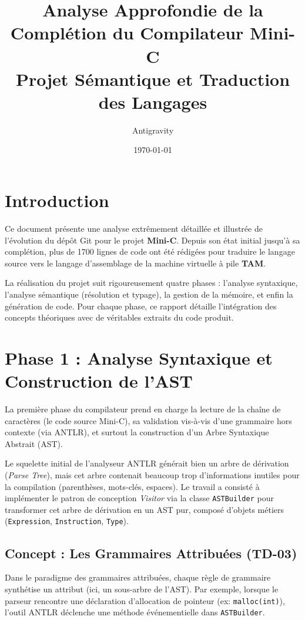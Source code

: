 \documentclass[12pt,a4paper]{article}
\title{Analyse Approfondie de la Complétion du Compilateur Mini-C \\ \large Projet Sémantique et Traduction des Langages}
\author{Antigravity}
\date{\today}
\begin{document}
\maketitle

\tableofcontents
\newpage

\section*{Introduction}
Ce document présente une analyse extrêmement détaillée et illustrée de l'évolution du dépôt Git pour le projet \textbf{Mini-C}. Depuis son état initial jusqu'à sa complétion, plus de 1700 lignes de code ont été rédigées pour traduire le langage source vers le langage d'assemblage de la machine virtuelle à pile \textbf{TAM}.

La réalisation du projet suit rigoureusement quatre phases : l'analyse syntaxique, l'analyse sémantique (résolution et typage), la gestion de la mémoire, et enfin la génération de code. Pour chaque phase, ce rapport détaille l'intégration des concepts théoriques avec de véritables extraits du code produit.

\newpage
\section{Phase 1 : Analyse Syntaxique et Construction de l'AST}

La première phase du compilateur prend en charge la lecture de la chaîne de caractères (le code source Mini-C), sa validation vis-à-vis d'une grammaire hors contexte (via ANTLR), et surtout la construction d'un Arbre Syntaxique Abstrait (AST).

Le squelette initial de l'analyseur ANTLR générait bien un arbre de dérivation (\textit{Parse Tree}), mais cet arbre contenait beaucoup trop d'informations inutiles pour la compilation (parenthèses, mots-clés, espaces). Le travail a consisté à implémenter le patron de conception \textit{Visitor} via la classe \texttt{ASTBuilder} pour transformer cet arbre de dérivation en un AST pur, composé d'objets métiers (\texttt{Expression}, \texttt{Instruction}, \texttt{Type}).

\subsection{Concept : Les Grammaires Attribuées (TD-03)}
Dans le paradigme des grammaires attribuées, chaque règle de grammaire synthétise un attribut (ici, un sous-arbre de l'AST). Par exemple, lorsque le parseur rencontre une déclaration d'allocation de pointeur (ex: \texttt{malloc(int)}), l'outil ANTLR déclenche une méthode événementielle dans \texttt{ASTBuilder}.
\end{document}
